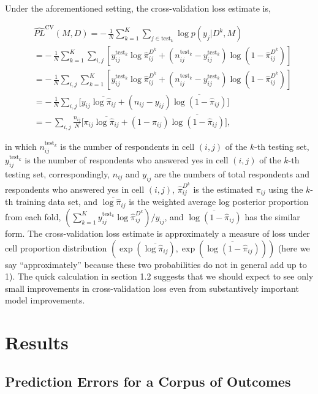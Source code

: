\documentclass[11pt,article,oneside]{memoir}
\begin{document}
Under the aforementioned setting, the cross-validation loss estimate is,

\begin{align*}
  \label{eq:CV4MultiWaySurvey}
  &\widehat{PL}^{\text{CV}}(M, D) =-\,\frac{1}{N}\sum_{k=1}^K\sum_{j\in \text{test}_k}\log p(y_j|D^k, M)\\
  & = -\,\frac{1}{N}\sum_{k=1}^K\sum_{i,j} [y^{\text{test}_k}_{ij}\log\hat\pi_{ij}^{D^k}+(n^{\text{test}_k}_{ij}- y^{\text{test}_k}_{ij})\log(1-\hat\pi_{ij}^{D^k})]\\
  & = -\,\frac{1}{N}\sum_{i,j}\sum_{k=1}^K[ y^{\text{test}_k}_{ij}\log\hat\pi_{ij}^{D^k}+(n^{\text{test}_k}_{ij}- y^{\text{test}_k}_{ij})\log(1-\hat\pi_{ij}^{D^k})]\\
  & = -\,\frac{1}{N}\sum_{i,j}\big[y_{ij}\overline{\log\hat{\pi}_{ij}} +(n_{ij}- y_{ij})\overline{\log(1-\hat\pi_{ij})}\big]\\
  & = -\,\sum_{i,j}\frac{n_{ij}}{N}\big[\pi_{ij}\overline{\log\hat\pi_{ij}} +(1- \pi_{ij})\overline{\log(1-\hat\pi_{ij})}\big],
\end{align*}

\noindent in which \(n_{ij}^{\text{test}_k}\) is the number of
respondents in cell \((i,j)\) of the \(k\)-th testing set,
\(y_{ij}^{\text{test}_k}\) is the number of respondents who answered yes
in cell \((i,j)\) of the \(k\)-th testing set, correspondingly,
\(n_{ij}\) and \(y_{ij}\) are the numbers of total respondents and
respondents who answered yes in cell \((i,j)\), \(\hat\pi_{ij}^{D^k}\)
is the estimated \(\pi_{ij}\) using the \(k\)-th training data set, and
\(\overline{\log\hat\pi_{ij}}\) is the weighted average log posterior
proportion from each fold,
\(\left(\sum_{k=1}^Ky^{\text{test}_k}_{ij}\log\hat\pi_{ij}^{D^k} \right)\big/y_{ij}\),
and \(\overline{\log(1-\hat\pi_{ij})}\) has the similar form. The
cross-validation loss estimate is approximately a measure of loss under
cell proportion distribution
\((\exp(\overline{\log\hat\pi_{ij}}), \exp(\overline{\log(1-\hat\pi_{ij})}))\)
(here we say ``approximately'' because these two probabilities do not in
general add up to 1). The quick calculation in section 1.2 suggests that
we should expect to see only small improvements in cross-validation loss
even from substantively important model improvements.

\section{Results}\label{results}

\subsection{Prediction Errors for a Corpus of
Outcomes}\label{prediction-errors-for-a-corpus-of-outcomes}
\end{document}
